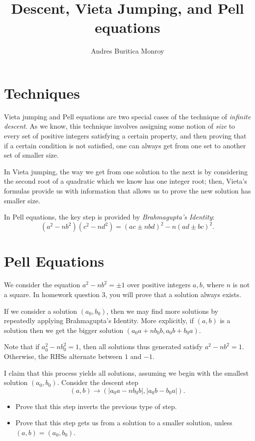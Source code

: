 \documentclass{article}
\title{Descent, Vieta Jumping, and Pell equations}
\author{Andres Buritica Monroy}
\date{}
\begin{document}
\maketitle
\section{Techniques}
Vieta jumping and Pell equations are two special cases of the technique of
\emph{infinite descent}. As we know, this technique involves assigning some
notion of \emph{size} to every set of positive integers satisfying a certain
property, and then proving that if a certain condition is not satisfied, one can
always get from one set to another set of smaller size.

In Vieta jumping, the way we get from one solution to the next is by considering
the second root of a quadratic which we know has one integer root; then, Vieta's
formulas provide us with information that allows us to prove the new solution
has smaller size.

In Pell equations, the key step is provided by \emph{Brahmagupta's
Identity}:
\[(a^2-nb^2)(c^2-nd^2)=(ac\pm nbd)^2-n(ad\pm bc)^2.\]
\section{Pell Equations}
We consider the equation $a^2-nb^2=\pm 1$ over positive integers $a,b$, where
$n$ is not a square. In homework question 3, you will prove that a solution
always exists.

If we consider a solution $(a_0,b_0)$, then we may find more
solutions by repeatedly applying Brahmagupta's Identity. More explicitly, if
$(a,b)$ is a solution then we get the bigger solution $(a_0 a+nb_0 b,a_0 b+b_0
a)$.

Note that if $a_0^2-nb_0^2=1$, then all solutions thus generated satisfy
$a^2-nb^2=1$. Otherwise, the RHSs alternate between $1$ and $-1$.

I claim that this process yields all solutions, assuming we begin with the
smallest solution $(a_0,b_0)$. Consider the descent step
\[(a,b)\to (|a_0 a-nb_0 b|,|a_0 b-b_0 a|).\]
\begin{itemize}
    \item Prove that this step inverts the previous type of step.
    \item Prove that this step gets us from a solution to a smaller solution,
        unless $(a,b)=(a_0,b_0)$.
\end{itemize}
\end{document}
